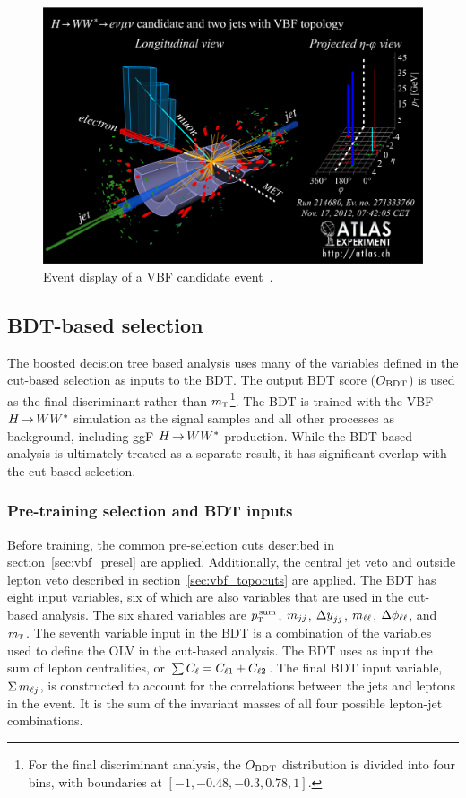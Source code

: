 \begin{figure}[h!]
  \centering
  \captionsetup{justification=centering}
  \includegraphics[width=\textwidth]{figures/eventdisplay}

  \caption{Event display of a VBF candidate event~\cite{WW2015}.}
  \label{fig:eventdisplay}
\end{figure}                                                                                     


\subsection{BDT-based selection}

The boosted decision tree based analysis uses many of the variables defined in the cut-based selection as inputs to the BDT. The output BDT score ($O_{\rm BDT}$) is used as the final discriminant rather than $m_{\textrm{\footnotesize\sc t}}$\footnote{For the final discriminant analysis, the $O_{\rm BDT}$ distribution is divided into four bins, with boundaries at $[-1, -0.48, -0.3, 0.78, 1]$.}. The BDT is trained with the VBF $H{\,{\rightarrow}\,}WW^\ast$ simulation as the signal samples and all other processes as background, including ggF $H{\,{\rightarrow}\,}WW^\ast$ production. While the BDT based analysis is ultimately treated as a separate result, it has significant overlap with the cut-based selection. 

\subsubsection{Pre-training selection and BDT inputs}
Before training, the common pre-selection cuts described in section~\ref{sec:vbf_presel} are applied. Additionally, the central jet veto and outside lepton veto described in section~\ref{sec:vbf_topocuts} are applied. The BDT has eight input variables, six of which are also variables that are used in the cut-based analysis. The six shared variables are $p_{\textrm{\footnotesize\sc t}}^{\,\rm sum}$, $m_{jj}$, $\dyjj$, $m_{\ell\ell}$, $\Delta\phi_{\ell\ell}$, and $m_{\textrm{\footnotesize\sc t}}$. The seventh variable input in the BDT is a combination of the variables used to define the OLV in the cut-based analysis. The BDT uses as input the sum of lepton centralities, or $\sum C_{\ell} = C_{\ell1} + C_{\ell2}$. The final BDT input variable, $\Sigma\,m_{\ell j}$, is constructed to account for the correlations between the jets and leptons in the event. It is the sum of the invariant masses of all four possible lepton-jet combinations.

